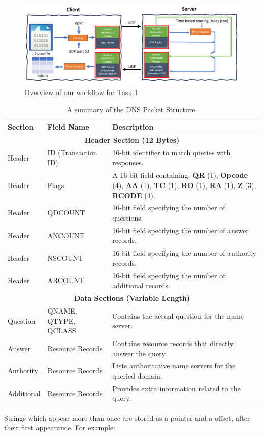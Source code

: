 \documentclass{article}
\begin{document}
\begin{figure}[H]
    \centering
    \includegraphics[width=\linewidth]{task1 overview.png}
    \caption{Overview of our workflow for Task 1}
    \label{fig:placeholder}
\end{figure}

\begin{table}[H]
\centering
\renewcommand{\arraystretch}{1.3} %
\begin{tabularx}{\textwidth}{|l|l|X|}
\hline
\textbf{Section} & \textbf{Field Name} & \textbf{Description} \\
\hline
\multicolumn{3}{|c|}{\textbf{Header Section (12 Bytes)}} \\
\hline
Header & ID (Transaction ID) & 16-bit identifier to match queries with responses. \\
\hline
Header & Flags & A 16-bit field containing: \newline
           \textbf{QR} (1), \textbf{Opcode} (4), \textbf{AA} (1), \textbf{TC} (1), \textbf{RD} (1), \textbf{RA} (1), \textbf{Z} (3), \textbf{RCODE} (4). \\
\hline
Header & QDCOUNT & 16-bit field specifying the number of questions. \\
\hline
Header & ANCOUNT & 16-bit field specifying the number of answer records. \\
\hline
Header & NSCOUNT & 16-bit field specifying the number of authority records. \\
\hline
Header & ARCOUNT & 16-bit field specifying the number of additional records. \\
\hline
\multicolumn{3}{|c|}{\textbf{Data Sections (Variable Length)}} \\
\hline
Question   & QNAME, QTYPE, QCLASS & Contains the actual question for the name server. \\
\hline
Answer     & Resource Records & Contains resource records that directly answer the query. \\
\hline
Authority  & Resource Records & Lists authoritative name servers for the queried domain. \\
\hline
Additional & Resource Records & Provides extra information related to the query. \\
\hline
\end{tabularx}
\caption{A summary of the DNS Packet Structure.}
\label{tab:dns_structure}
\end{table}
Strings which appear more than once are stored as a pointer and a offset, after their first appearance. For example:
\end{document}
